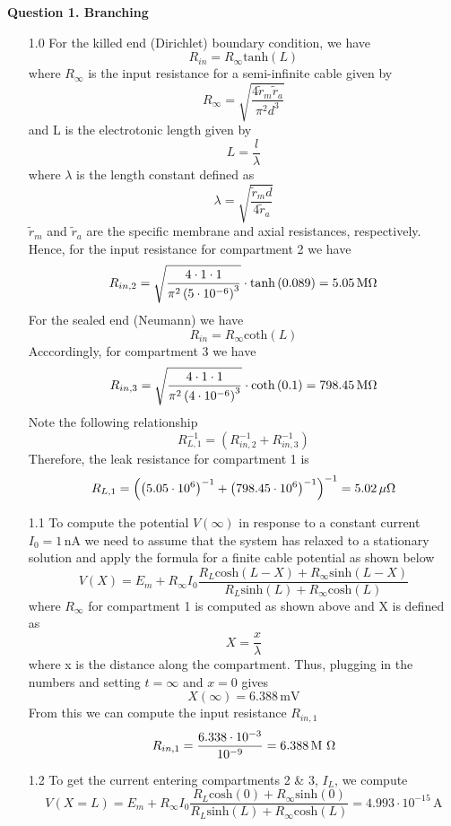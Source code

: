 \documentclass[12pt]{article}
\begin{document}
\noindent


\noindent\textbf{Question 1. Branching}
\begin{enumerate}
    \item[1.0] For the killed end (Dirichlet) boundary condition, we have
    $$R_{in} =  R_{\infty} \text{tanh}(L)$$
    where $R_{\infty}$ is the input resistance for a semi-infinite cable given by
    $$R_{\infty} = \sqrt{\frac{4\tilde{r}_{m}\tilde{r}_{a}}{\pi^{2}d^{3}}}$$
    and L is the electrotonic length given by 
    $$L = \frac{l}{\lambda}$$
    where $\lambda$ is the length constant defined as
    $$\lambda = \sqrt{\frac{\tilde{r}_{m}d}{4\tilde{r}_{a}}}$$
    $\tilde{r}_{m}$ and $\tilde{r}_{a}$ are the specific membrane and axial resistances, respectively. Hence, for the input resistance for compartment 2 we have
    $$R_{in,2} = \sqrt{\frac{4\cdot 1\cdot 1}{\pi^{2}\left(5\cdot 10^{-6}\right)^{3}}}\cdot \text{tanh}\left(0.089\right) = 5.05 \, \text{M\si{\ohm}}$$
    For the sealed end (Neumann) we have
    $$R_{in} =  R_{\infty} \text{coth}(L)$$
    Acccordingly, for compartment 3 we have
    $$R_{in,3} = \sqrt{\frac{4\cdot 1\cdot 1}{\pi^{2}\left(4\cdot 10^{-6}\right)^{3}}}\cdot \text{coth}\left(0.1\right) = 798.45 \, \text{M\si{\ohm}}$$
    Note the following relationship
    $$R_{L,1}^{-1} = \left(R_{in,2}^{-1} + R_{in,3}^{-1}\right)$$
    Therefore, the leak resistance for compartment 1 is
    $$R_{L,1} = \left(\left(5.05\cdot 10^{6}\right)^{-1} + \left(798.45\cdot 10^{6}\right)^{-1}\right)^{-1} = 5.02 \, \mu \text{\si{\ohm}}$$
    \item[1.1] To compute the potential $V(\infty)$ in response to a constant current $I_{0}=1 \, \text{nA}$ we need to assume that the system has relaxed to a stationary solution and apply the formula for a finite cable potential as shown below
    $$V(X) = E_{m} + R_{\infty}I_{0}\frac{R_{L}\text{cosh}\left(L-X\right) + R_{\infty}\text{sinh}\left(L-X\right)}{R_{L}\text{sinh}\left(L\right) + R_{\infty}\text{cosh}\left(L\right)}$$
    where $R_{\infty}$ for compartment 1 is computed as shown above and X is defined as 
    $$X = \frac{x}{\lambda}$$
    where x is the distance along the compartment. Thus, plugging in the numbers and setting $t=\infty$ and $x=0$ gives
    $$X(\infty) = 6.388 \, \text{mV}$$
    From this we can compute the input resistance $R_{in, 1}$
    $$R_{in, 1} = \frac{6.338\cdot 10^{-3}}{10^{-9}} = 6.388 \, \text{M \si{\ohm}}$$
    \item[1.2] To get the current entering compartments 2 \& 3, $I_{L}$, we compute
    $$V(X=L) = E_{m} + R_{\infty}I_{0}\frac{R_{L}\text{cosh}\left(0\right) + R_{\infty}\text{sinh}\left(0\right)}{R_{L}\text{sinh}\left(L\right) + R_{\infty}\text{cosh}\left(L\right)} = 4.993\cdot 10^{-15} \, \text{A}$$

\end{enumerate}
\end{document}
